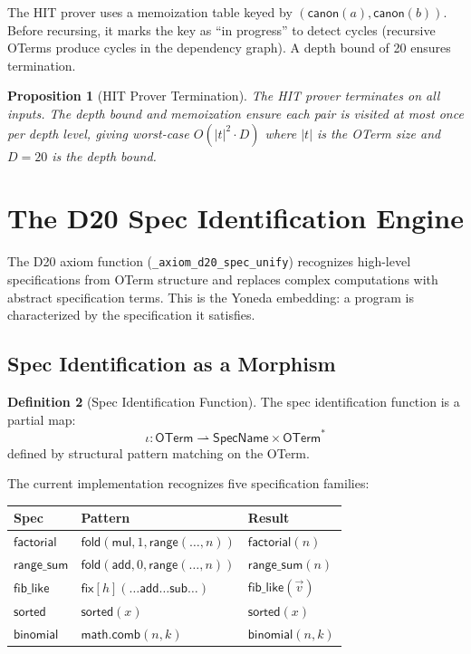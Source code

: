 \documentclass[11pt,a4paper]{report}
\theoremstyle{definition}
\newtheorem{definition}{Definition}[chapter]
\theoremstyle{plain}
\newtheorem{proposition}[definition]{Proposition}
\newcommand{\fold}{\mathsf{fold}}
\begin{document}
The HIT prover uses a memoization table keyed by
$(\mathsf{canon}(a), \mathsf{canon}(b))$.  Before recursing,
it marks the key as ``in progress'' to detect cycles (recursive
OTerms produce cycles in the dependency graph).  A depth bound
of 20 ensures termination.

\begin{proposition}[HIT Prover Termination]
The HIT prover terminates on all inputs.  The depth bound and
memoization ensure each pair is visited at most once per depth
level, giving worst-case $O(|t|^2 \cdot D)$ where $|t|$ is
the OTerm size and $D = 20$ is the depth bound.
\end{proposition}


\section{The D20 Spec Identification Engine}
\label{sec:d20-formal}

The D20 axiom function (\texttt{\_axiom\_d20\_spec\_unify})
recognizes high-level specifications from OTerm structure and
replaces complex computations with abstract specification terms.
This is the Yoneda embedding: a program is characterized by
the specification it satisfies.

\subsection{Spec Identification as a Morphism}

\begin{definition}[Spec Identification Function]
\label{def:spec-id}
The spec identification function is a partial map:
\[
  \iota : \mathsf{OTerm} \rightharpoonup
  \mathsf{SpecName} \times \mathsf{OTerm}^*
\]
defined by structural pattern matching on the OTerm.
\end{definition}

The current implementation recognizes five specification families:

\begin{center}
\begin{tabular}{lp{6cm}l}
\hline
\textbf{Spec} & \textbf{Pattern} & \textbf{Result} \\
\hline
$\mathsf{factorial}$ &
  $\fold(\mathsf{mul}, 1, \mathsf{range}(\ldots, n))$ &
  $\mathsf{factorial}(n)$ \\
$\mathsf{range\_sum}$ &
  $\fold(\mathsf{add}, 0, \mathsf{range}(\ldots, n))$ &
  $\mathsf{range\_sum}(n)$ \\
$\mathsf{fib\_like}$ &
  $\mathsf{fix}[h](\ldots\mathsf{add}\ldots\mathsf{sub}\ldots)$ &
  $\mathsf{fib\_like}(\vec{v})$ \\
$\mathsf{sorted}$ &
  $\mathsf{sorted}(x)$ &
  $\mathsf{sorted}(x)$ \\
$\mathsf{binomial}$ &
  $\mathsf{math.comb}(n,k)$ &
  $\mathsf{binomial}(n,k)$ \\
\hline
\end{tabular}
\end{center}
\end{document}
